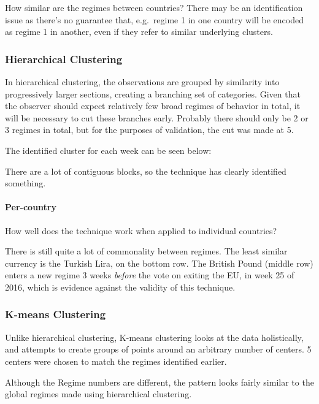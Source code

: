 \documentclass[]{article}
\let\oldparagraph\paragraph
\renewcommand{\paragraph}[1]{\oldparagraph{#1}\mbox{}}
\begin{document}
How similar are the regimes between countries? There may be an
identification issue as there's no guarantee that, e.g.~regime 1 in one
country will be encoded as regime 1 in another, even if they refer to
similar underlying clusters.

\subsubsection{Hierarchical Clustering}\label{hierarchical-clustering}

In hierarchical clustering, the observations are grouped by similarity
into progressively larger sections, creating a branching set of
categories. Given that the observer should expect relatively few broad
regimes of behavior in total, it will be necessary to cut these branches
early. Probably there should only be 2 or 3 regimes in total, but for
the purposes of validation, the cut was made at 5.

The identified cluster for each week can be seen below:

There are a lot of contiguous blocks, so the technique has clearly
identified something.

\paragraph{Per-country}\label{per-country}

How well does the technique work when applied to individual countries?

There is still quite a lot of commonality between regimes. The least
similar currency is the Turkish Lira, on the bottom row. The British
Pound (middle row) enters a new regime 3 weeks \emph{before} the vote on
exiting the EU, in week 25 of 2016, which is evidence against the
validity of this technique.

\subsubsection{K-means Clustering}\label{k-means-clustering}

Unlike hierarchical clustering, K-means clustering looks at the data
holistically, and attempts to create groups of points around an
arbitrary number of centers. 5 centers were chosen to match the regimes
identified earlier.

Although the Regime numbers are different, the pattern looks fairly
similar to the global regimes made using hierarchical clustering.
\end{document}
